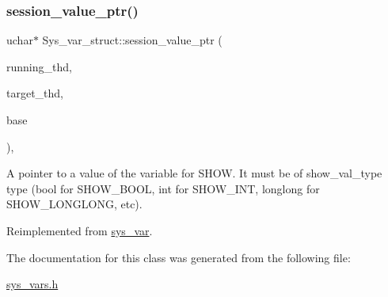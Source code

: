 \subsubsection{\texorpdfstring{session\+\_\+value\+\_\+ptr()}{session\_value\_ptr()}}
{\footnotesize\ttfamily uchar$\ast$ Sys\+\_\+var\+\_\+struct\+::session\+\_\+value\+\_\+ptr (\begin{DoxyParamCaption}\item[{T\+HD $\ast$}]{running\+\_\+thd,  }\item[{T\+HD $\ast$}]{target\+\_\+thd,  }\item[{L\+E\+X\+\_\+\+S\+T\+R\+I\+NG $\ast$}]{base }\end{DoxyParamCaption})\hspace{0.3cm}{\ttfamily [inline]}, {\ttfamily [virtual]}}

A pointer to a value of the variable for S\+H\+OW. It must be of show\+\_\+val\+\_\+type type (bool for S\+H\+O\+W\+\_\+\+B\+O\+OL, int for S\+H\+O\+W\+\_\+\+I\+NT, longlong for S\+H\+O\+W\+\_\+\+L\+O\+N\+G\+L\+O\+NG, etc). 

Reimplemented from \mbox{\hyperlink{classsys__var_a3e511591aaf555d2bc2ce40a80b7e899}{sys\+\_\+var}}.



The documentation for this class was generated from the following file\+:\begin{DoxyCompactItemize}
\item 
\mbox{\hyperlink{sys__vars_8h}{sys\+\_\+vars.\+h}}\end{DoxyCompactItemize}
